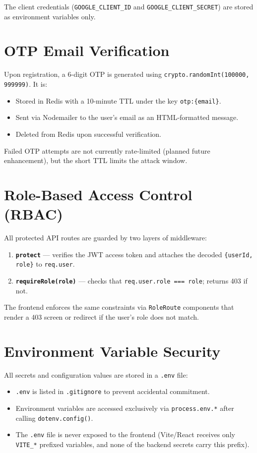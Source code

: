 The client credentials (\texttt{GOOGLE\_CLIENT\_ID} and \texttt{GOOGLE\_CLIENT\_SECRET}) are stored as environment variables only.

\section{OTP Email Verification}

Upon registration, a 6-digit OTP is generated using \texttt{crypto.randomInt(100000, 999999)}. It is:

\begin{itemize}
  \item Stored in Redis with a 10-minute TTL under the key \texttt{otp:\{email\}}.
  \item Sent via Nodemailer to the user's email as an HTML-formatted message.
  \item Deleted from Redis upon successful verification.
\end{itemize}

Failed OTP attempts are not currently rate-limited (planned future enhancement), but the short TTL limits the attack window.

\section{Role-Based Access Control (RBAC)}

All protected API routes are guarded by two layers of middleware:

\begin{enumerate}
  \item \textbf{\texttt{protect}} — verifies the JWT access token and attaches the decoded \texttt{\{userId, role\}} to \texttt{req.user}.
  \item \textbf{\texttt{requireRole(role)}} — checks that \texttt{req.user.role === role}; returns 403 if not.
\end{enumerate}

The frontend enforces the same constraints via \texttt{RoleRoute} components that render a 403 screen or redirect if the user's role does not match.

\section{Environment Variable Security}

All secrets and configuration values are stored in a \texttt{.env} file:

\begin{itemize}
  \item \texttt{.env} is listed in \texttt{.gitignore} to prevent accidental commitment.
  \item Environment variables are accessed exclusively via \texttt{process.env.*} after calling \texttt{dotenv.config()}.
  \item The \texttt{.env} file is never exposed to the frontend (Vite/React receives only \texttt{VITE\_*} prefixed variables, and none of the backend secrets carry this prefix).
\end{itemize}

